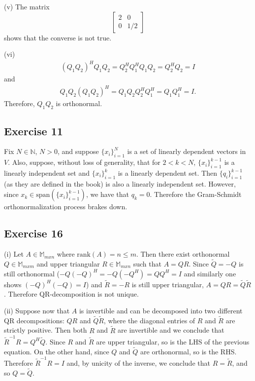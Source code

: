 \documentclass[11.5pt, letterpaper, bibtotoc,
    tablecaptionabove, figurecaptionabove]{article}
\begin{document}
(v)
The matrix
\[\begin{bmatrix}
    2 & 0\\
    0 & 1/2
\end{bmatrix}\]
shows that the converse is not true.

(vi)
\begin{align*}
    (Q_1Q_2)^HQ_1Q_2=Q_2^HQ_1^HQ_1Q_2=Q_2^HQ_2=I
\end{align*}
and
\begin{align*}
     Q_1Q_2(Q_1Q_2)^H=Q_1Q_2Q_2^HQ_1^H=Q_1Q_1^H=I.
\end{align*}
Therefore, $Q_1Q_2$ is orthonormal.

\subsection*{Exercise 11}
Fix $N\in\mathbb N$, $N>0$, and suppose $\{x_i\}_{i=1}^N$ is a set of
linearly dependent vectors in $V$.
Also, suppose, without loss of generality, that for $2<k<N$,
$\{x_i\}_{i=1}^{k-1}$ is a linearly independent set and $\{x_i\}_{i=1}^k$ is a linearly dependent set.
Then $\{q_i\}_{i=1}^{k-1}$ (as they are defined in the book) is also a linearly independent set.
However, since $x_k\in\text{span}(\{x_i\}_{i=1}^{k-1})$, we have that $q_k=0$.
Therefore the Gram-Schmidt orthonormalization process brakes down.

\subsection*{Exercise 16}
(i)
Let $A\in\mathbb M_{mxn}$ where $\text{rank}(A)=n\leq m$.
Then there exist orthonormal $Q\in\mathbb M_{mxm}$ and
upper triangular $R\in\mathbb M_{mxn}$ such that $A=QR$.
Since $\tilde{Q}=-Q$ is still orthonormal ($-Q(-Q)^H=-Q(-Q^H)=QQ^H=I$ 
and similarly one shows $(-Q)^H(-Q)=I$)
and $\tilde{R}=-R$ is still upper triangular, 
$A=QR=\tilde{Q}\tilde{R}$.
Therefore QR-decomposition is not unique.

(ii)
Suppose now that $A$ is invertible and can be decomposed into 
two different QR decompositions: $QR$ and $\tilde{Q}\tilde{R}$,
where the diagonal entries of $R$ and $\tilde{R}$ are strictly positive.
Then both $R$ and $\tilde{R}$ are invertible and we conclude that
$\tilde{R}^{-1}R=Q^H\tilde{Q}$.
Since $R$ and $\tilde{R}$ are upper triangular, so is the LHS of the previous equation.
On the other hand, since $Q$ and $\tilde{Q}$ are orthonormal, so is the RHS.
Therefore $\tilde{R}^{-1}R=I$ and, by unicity of the inverse, we conclude that $R=\tilde{R}$,
and so $Q=\tilde{Q}$.
\end{document}
